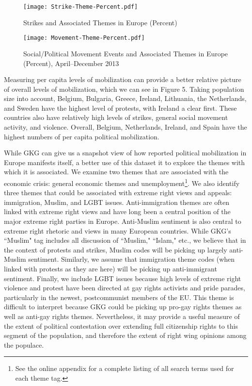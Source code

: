 \documentclass[10pt]{article}
\begin{document}
\begin{figure*}
\begin{center}
\texttt{[image: Strike-Theme-Percent.pdf]}
\caption{Strikes and Associated Themes in Europe (Percent)}
\end{center}
\end{figure*}


\begin{figure*}[h!]
\begin{center}
\texttt{[image: Movement-Theme-Percent.pdf]}
\caption{Social/Political Movement Events and Associated Themes in Europe (Percent), April--December 2013}
\end{center}
\end{figure*}

Measuring per capita levels of mobilization can provide a better relative picture of overall levels of mobilization, which we can see in Figure 5.   Taking population size into account, Belgium, Bulgaria, Greece, Ireland, Lithuania, the Netherlands, and Sweden have the highest level of protests, with Ireland a clear first.  These countries also have relatively high levels of strikes, general social movement activity, and violence.  Overall, Belgium, Netherlands, Ireland, and Spain have the highest numbers of per capita political mobilization.

While GKG can give us a snapshot view of how reported political mobilization in Europe manifests itself, a better use of this dataset it to explore the themes with which it is associated.  We examine two themes that are associated with the economic crisis: general economic themes and unemployment\footnote{See the online appendix for a complete listing of all search terms used for each theme tag.}.  We also identify three themes that could be associated with extreme right views and appeals: immigration, Muslim, and LGBT issues.  Anti-immigration themes are often linked with extreme right views and have long been a central position of the major extreme right parties in Europe.  Anti-Muslim sentiment is also central to extreme right rhetoric and views in many European countries.  While GKG's ``Muslim" tag includes all discussion of ``Muslim," ``Islam," etc., we believe that in the context of protests and strikes, Muslim codes will be picking up largely anti-Muslim sentiment.  Similarly, we assume that immigration theme codes (when linked with protests as they are here) will be picking up anti-immigrant sentiment.  Finally, we include LGBT issues because high levels of extreme right violence and protest have been directed at gay rights activists and pride parades, particularly in the newest, postcommunist members of the EU.  This theme is difficult to interpret because GKG could be picking up pro-gay rights themes as well as anti-gay rights themes.  Nevertheless, it may provide a useful measure of the extent of political contestation over extending full citizenship rights to this segment of the population, and therefore the extent of right wing opinions among the populace.
\end{document}
